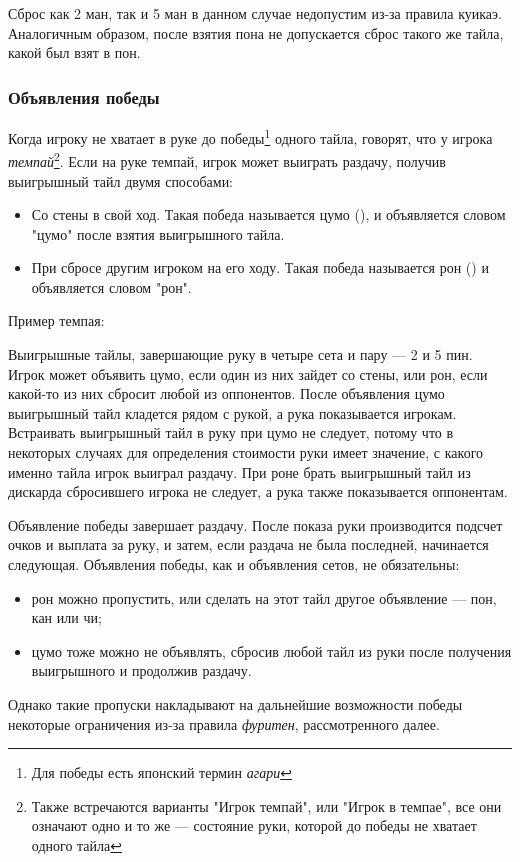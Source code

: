 Сброс как 2 ман, так и 5 ман в данном случае недопустим из-за правила куикаэ. Аналогичным образом, после взятия пона не допускается сброс такого же тайла, какой был взят в пон.

\subsubsection{Объявления победы}

Когда игроку не хватает в руке до победы\footnote{Для победы есть японский термин \textit{агари}} одного тайла, говорят, что у игрока \textit{темпай}\footnote{Также встречаются варианты "Игрок темпай", или "Игрок в темпае", все они означают одно и то же --- состояние руки, которой до победы не хватает одного тайла}. Если на руке темпай, игрок может выиграть раздачу, получив выигрышный тайл двумя способами:

\begin{itemize}
	\item Со стены в свой ход. Такая победа называется цумо (), и объявляется словом "цумо" после взятия выигрышного тайла.
	\item При сбросе другим игроком на его ходу. Такая победа называется рон () и объявляется словом "рон".
\end{itemize}

Пример темпая:

 \hfill {}

Выигрышные тайлы, завершающие руку в четыре сета и пару --- 2 и 5 пин. Игрок может объявить цумо, если один из них зайдет со стены, или рон, если какой-то из них сбросит любой из оппонентов. После объявления цумо выигрышный тайл кладется рядом с рукой, а рука показывается игрокам. Встраивать выигрышный тайл в руку при цумо не следует, потому что в некоторых случаях для определения стоимости руки имеет значение, с какого именно тайла игрок выиграл раздачу. При роне брать выигрышный тайл из дискарда сбросившего игрока не следует, а рука также показывается оппонентам.

Объявление победы завершает раздачу. После показа руки производится подсчет очков и выплата за руку, и затем, если раздача не была последней, начинается следующая. Объявления победы, как и объявления сетов, не обязательны:
\begin{itemize}
	\item рон можно пропустить, или сделать на этот тайл другое объявление --- пон, кан или чи;
	\item цумо тоже можно не объявлять, сбросив любой тайл из руки после получения выигрышного и продолжив раздачу.
\end{itemize}
Однако такие пропуски накладывают на дальнейшие возможности победы некоторые ограничения из-за правила \textit{фуритен}, рассмотренного далее.

